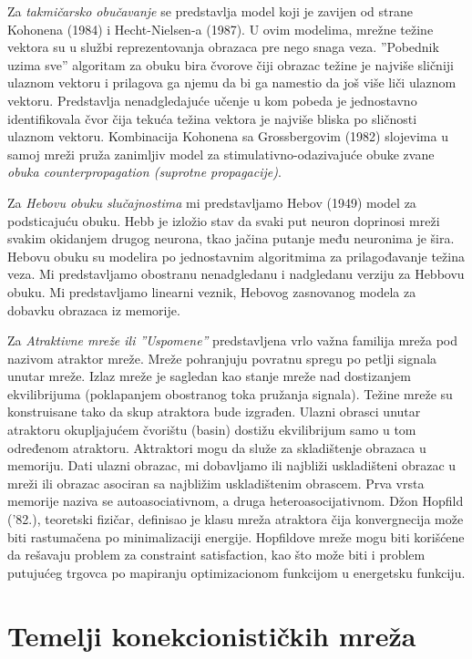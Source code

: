 \documentclass[fontsize=11bp, paper=a4]{scrarticle}
\begin{document}
Za \textit{takmičarsko obučavanje} se predstavlja model koji je zavijen od strane Kohonena (1984) i Hecht-Nielsen-a (1987). U ovim modelima, mrežne težine vektora su u službi reprezentovanja obrazaca pre nego snaga veza. ''Pobednik uzima sve'' algoritam za obuku bira čvorove čiji obrazac težine je najviše sličniji ulaznom vektoru i prilagova ga njemu da bi ga namestio da još više liči ulaznom vektoru. Predstavlja nenadgledajuće učenje u kom pobeda je jednostavno identifikovala čvor čija tekuća težina vektora je najviše bliska po sličnosti ulaznom vektoru. Kombinacija Kohonena sa Grossbergovim (1982) slojevima u samoj mreži pruža zanimljiv model za stimulativno-odazivajuće obuke zvane \textit{obuka counterpropagation (suprotne propagacije)}.

Za \textit{Hebovu obuku slučajnostima} mi predstavljamo Hebov (1949) model za podsticajuću obuku. Hebb je izložio stav da svaki put neuron doprinosi mreži svakim okidanjem drugog neurona, tkao jačina putanje među neuronima je šira. Hebovu obuku su modelira po jednostavnim algoritmima za prilagođavanje težina veza. Mi predstavljamo obostranu nenadgledanu i nadgledanu verziju za Hebbovu obuku. Mi predstavljamo linearni veznik, Hebovog zasnovanog modela za dobavku obrazaca iz memorije.

Za \textit{Atraktivne mreže ili ''Uspomene''} predstavljena vrlo važna familija mreža pod nazivom atraktor mreže. Mreže pohranjuju povratnu spregu po petlji signala unutar mreže. Izlaz mreže je sagledan kao stanje mreže nad dostizanjem ekvilibrijuma (poklapanjem obostranog toka pružanja signala). Težine mreže su konstruisane tako da skup atraktora bude izgrađen. Ulazni obrasci unutar atraktoru okupljajućem čvorištu (basin) dostižu ekvilibrijum samo u tom određenom atraktoru. Aktraktori mogu da služe za skladištenje obrazaca u memoriju. Dati ulazni obrazac, mi dobavljamo ili najbliži uskladišteni obrazac u mreži ili obrazac asociran sa najbližim uskladištenim obrascem. Prva vrsta memorije naziva se autoasociativnom, a druga heteroasocijativnom. Džon Hopfild ('82.), teoretski fizičar, definisao je klasu mreža atraktora čija konvergnecija može biti rastumačena po minimalizaciji energije. Hopfildove mreže mogu biti korišćene da rešavaju problem za constraint satisfaction, kao što može biti i problem putujućeg trgovca po mapiranju optimizacionom funkcijom u energetsku funkciju.

\section{Temelji konekcionističkih mreža}
\end{document}
